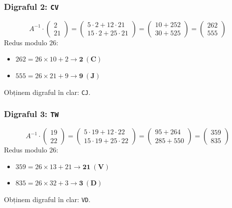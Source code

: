 \documentclass[12pt]{article}
\begin{document}
\subsubsection*{Digraful 2: \texttt{CV}}
\[
A^{-1} \cdot \begin{pmatrix} 2 \\ 21 \end{pmatrix} = \begin{pmatrix} 5 \cdot 2 + 12 \cdot 21 \\ 15 \cdot 2 + 25 \cdot 21 \end{pmatrix} = \begin{pmatrix} 10 + 252 \\ 30 + 525 \end{pmatrix} = \begin{pmatrix} 262 \\ 555 \end{pmatrix}
\]
Redus modulo $26$:
\begin{itemize}
    \item $262 = 26 \times 10 + 2 \rightarrow \mathbf{2 \ (C)}$
    \item $555 = 26 \times 21 + 9 \rightarrow \mathbf{9 \ (J)}$
\end{itemize}
Obținem digraful în clar: \texttt{CJ}.

\subsubsection*{Digraful 3: \texttt{TW}}
\[
A^{-1} \cdot \begin{pmatrix} 19 \\ 22 \end{pmatrix} = \begin{pmatrix} 5 \cdot 19 + 12 \cdot 22 \\ 15 \cdot 19 + 25 \cdot 22 \end{pmatrix} = \begin{pmatrix} 95 + 264 \\ 285 + 550 \end{pmatrix} = \begin{pmatrix} 359 \\ 835 \end{pmatrix}
\]
Redus modulo $26$:
\begin{itemize}
    \item $359 = 26 \times 13 + 21 \rightarrow \mathbf{21 \ (V)}$
    \item $835 = 26 \times 32 + 3 \rightarrow \mathbf{3 \ (D)}$
\end{itemize}
Obținem digraful în clar: \texttt{VD}.
\end{document}
